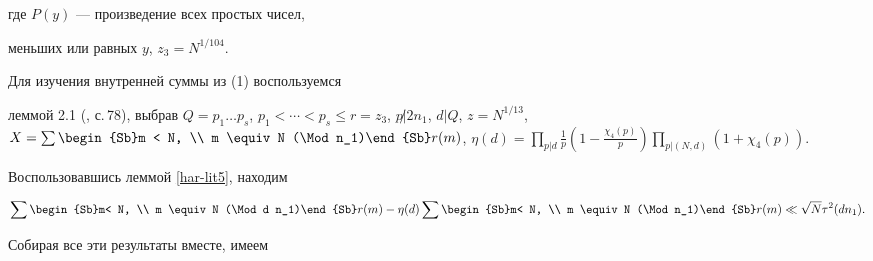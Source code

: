 где $P(y)$ --- произведение всех простых чисел,


меньших или равных $y$, $z_3 = N^{1/104}$.


Для изучения внутренней суммы из (1) воспользуемся


леммой 2.1 (\cite{elliot}, с.\,78), выбрав $Q = p_1 \dotsc


p_s$, $p_1 < \dotsb < p_s \le r = z_3$, $p \not| 2 n_1$, $d|Q$, $z


= N^{1/13}$, $X=\sum\limits\begin{Sb}m < N, \\ m \equiv N (\Mod n_1)\end{Sb}


r(m)$, $\eta(d) = \prod\limits_{p|d} \frac1{p} ( 1 -


\frac{\chi_4(p)}{p} ) \prod\limits_{p| (N,d)} ( 1 + \chi_4(p) )$.





Воспользовавшись леммой \ref{har-lit5}, находим


$$


\sum\begin{Sb}m< N, \\ m \equiv N (\Mod d n_1)\end{Sb} r(m)


-\eta(d) \sum\begin{Sb}m< N, \\ m \equiv N (\Mod n_1)\end{Sb} r(m)


\ll \sqrt N \tau^2(d n_1).


$$


Собирая все эти результаты вместе, имеем


